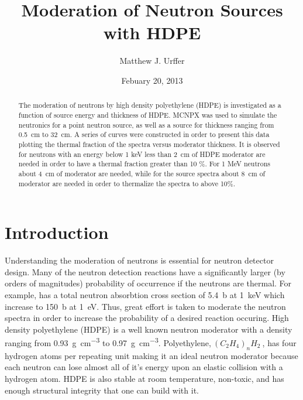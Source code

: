 \documentclass[final,onecolumn]{IEEEtran}
\begin{document}
\title{Moderation of Neutron Sources with HDPE}
\author{Matthew J. Urffer}
\date{Febuary 20, 2013}

\maketitle
\begin{abstract}
The moderation of neutrons by high density polyethylene (HDPE) is investigated as a function of source energy and thickness of HDPE.
MCNPX was used to simulate the neutronics for a point neutron source, as well as a  source for thickness ranging from \SI{0.5}{\centi\meter} to \SI{32}{\centi\meter}.
A series of curves were constructed in order to present this data plotting the thermal fraction of the spectra versus moderator thickness.
It is observed for neutrons with an energy below 1 keV less than \SI{2}{\centi\meter} of HDPE moderator are needed in order to have a thermal fraction greater than 10 \%.
For 1 MeV neutrons about \SI{4}{\centi\meter} of moderator are needed, while for the  source spectra about \SI{8}{\centi\meter} of moderator are needed in order to thermalize the spectra to above 10\%.
\end{abstract}

\IEEEpeerreviewmaketitle

\tableofcontents
\listoftodos
\listoffigures
\lstlistoflistings

\section{Introduction}
Understanding the moderation of neutrons is essential for neutron detector design.
Many of the neutron detection reactions have a significantly larger (by orders of magnitudes) probability of occurrence if the neutrons are thermal.
For example,  has a total neutron absorbtion cross section of \SI{5.4}{\barn} at \SI{1}{\kilo\electronvolt} which increase to \SI{150}{\barn} at \SI{1}{\electronvolt}.
Thus, great effort is taken to moderate the neutron spectra in order to increase the probability of a desired reaction occuring.
High density polyethylene (HDPE) is a well known neutron moderator with a density ranging from \SI{0.93}{\gram\per\cubic\centi\meter} to \SI{0.97}{\gram\per\cubic\centi\meter}.
Polyethylene,$~\left (C_2 H_4\right )_n H_2~$, has four hydrogen atoms per repeating unit making it an ideal neutron moderator because each neutron can lose almost all of it's energy upon an elastic collision with a hydrogen atom.
HDPE is also stable at room temperature, non-toxic, and has enough structural integrity that one can build with it.
\end{document}
